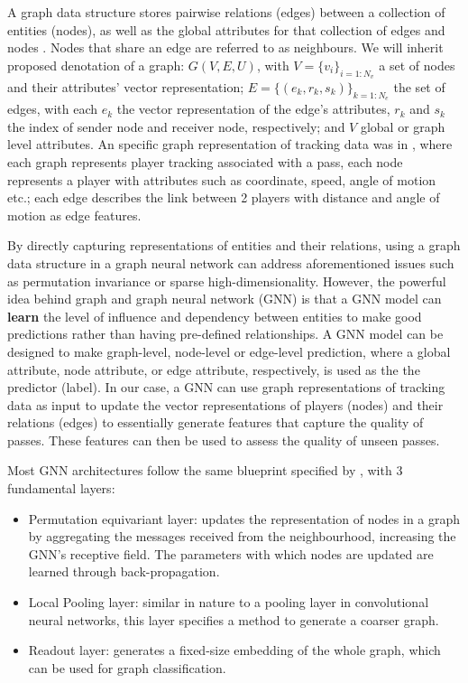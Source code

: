\documentclass[conference]{IEEEtran}
\begin{document}
A graph data structure stores pairwise relations (edges) between a collection of entities (nodes), as well as the global attributes for that collection of edges and nodes \parencite{gnnbias}. Nodes that share an edge are referred to as neighbours. We will inherit \textcite{gnnbias} proposed denotation of a graph: $G(V,E,U)$, with $V=\{v_i\}_{i=1:N_v}$ a set of nodes and their attributes' vector representation; $E=\{(e_k, r_k, s_k)\}_{k=1:N_e}$ the set of edges, with each $e_k$ the vector representation of the edge's attributes, $r_k$ and $s_k$ the index of sender node and receiver node, respectively; and $V$ global or graph level attributes. An specific graph representation of tracking data was in \textcite{GNNPaulPower}, where each graph represents player tracking associated with a pass, each node represents a player with attributes such as coordinate, speed, angle of motion etc.; each edge describes the link between 2 players with distance and angle of motion as edge features.



By directly capturing representations of entities and their relations, using a graph data structure in a graph neural network can address aforementioned issues such as permutation invariance or sparse high-dimensionality. However, the powerful idea behind graph and graph neural network (GNN) is that a GNN model can \textbf{learn} the level of influence and dependency between entities to make good predictions rather than having pre-defined relationships. A GNN model can be designed to make graph-level, node-level or edge-level prediction, where a global attribute, node attribute, or edge attribute, respectively, is used as the the predictor (label). In our case, a GNN can use graph representations of tracking data as input to update the vector representations of players (nodes) and their relations (edges) to essentially generate features that capture the quality of passes. These features can then be used to assess the quality of unseen passes.

Most GNN architectures follow the same blueprint specified by \textcite{gnnarchi}, with 3 fundamental layers:
\begin{itemize}
\item Permutation equivariant layer: updates the representation of nodes in a graph by aggregating the messages received from the neighbourhood, increasing the GNN's receptive field. The parameters with which nodes are updated are learned through back-propagation.
\item Local Pooling layer: similar in nature to a pooling layer in convolutional neural networks, this layer specifies a method to generate a coarser graph.
\item Readout layer: generates a fixed-size embedding of the whole graph, which can be used for graph classification.

\end{itemize}
\end{document}
